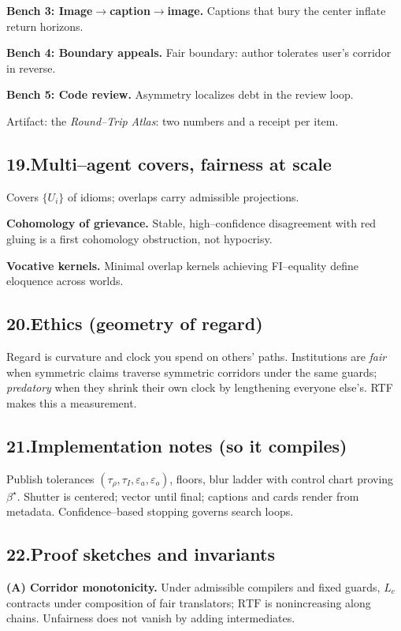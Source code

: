 \documentclass[11pt]{article}
\begin{document}
\textbf{Bench 3: Image$\to$caption$\to$image.} Captions that bury the center inflate return horizons.

\textbf{Bench 4: Boundary appeals.} Fair boundary: author tolerates user's corridor in reverse.

\textbf{Bench 5: Code review.} Asymmetry localizes debt in the review loop.

Artifact: the \emph{Round--Trip Atlas}: two numbers and a receipt per item.

\subsection*{19.\quad Multi--agent covers, fairness at scale}
Covers $\{U_i\}$ of idioms; overlaps carry admissible projections.

\textbf{Cohomology of grievance.} Stable, high--confidence disagreement with red gluing is a first cohomology obstruction, not hypocrisy.

\textbf{Vocative kernels.} Minimal overlap kernels achieving FI--equality define eloquence across worlds.

\subsection*{20.\quad Ethics (geometry of regard)}
Regard is curvature and clock you spend on others' paths. Institutions are \emph{fair} when symmetric claims traverse symmetric corridors under the same guards; \emph{predatory} when they shrink their own clock by lengthening everyone else's. RTF makes this a measurement.

\subsection*{21.\quad Implementation notes (so it compiles)}
Publish tolerances $(\tau_{\rho},\tau_I,\varepsilon_a,\varepsilon_o)$, floors, blur ladder with control chart proving $\beta^\star$. Shutter is centered; vector until final; captions and cards render from metadata. Confidence--based stopping governs search loops.

\subsection*{22.\quad Proof sketches and invariants}
\textbf{(A) Corridor monotonicity.} Under admissible compilers and fixed guards, $L_c$ contracts under composition of fair translators; $\mathrm{RTF}$ is nonincreasing along chains. Unfairness does not vanish by adding intermediates.
\end{document}
